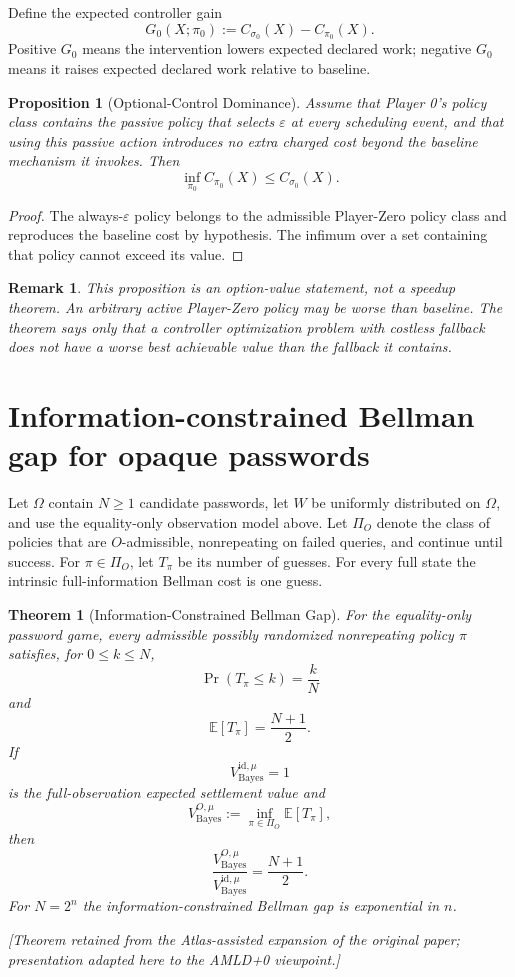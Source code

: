 \documentclass[11pt]{article}
\newtheorem{remark}[definition]{Remark}
\newtheorem{theorem}[definition]{Theorem}
\newtheorem{proposition}[definition]{Proposition}
\newcommand{\atlasnote}{\par\smallskip\noindent\textit{[Theorem retained from the Atlas-assisted expansion of the original paper; presentation adapted here to the AMLD+0 viewpoint.] }\par\smallskip}
\begin{document}
Define the expected controller gain
\[
G_0(X;\pi_0)
:=C_{\sigma_0}(X)-C_{\pi_0}(X).
\]
Positive $G_0$ means the intervention lowers expected declared work; negative
$G_0$ means it raises expected declared work relative to baseline.

\begin{proposition}[Optional-Control Dominance]
Assume that Player 0's policy class contains the passive policy that selects
$\varepsilon$ at every scheduling event, and that using this passive action
introduces no extra charged cost beyond the baseline mechanism it invokes.
Then
\[
\inf_{\pi_0} C_{\pi_0}(X)\le C_{\sigma_0}(X).
\]
\end{proposition}

\begin{proof}
The always-$\varepsilon$ policy belongs to the admissible Player-Zero policy
class and reproduces the baseline cost by hypothesis.  The infimum over a set
containing that policy cannot exceed its value.
\end{proof}

\begin{remark}
This proposition is an option-value statement, not a speedup theorem.  An
arbitrary active Player-Zero policy may be worse than baseline.  The theorem
says only that a controller optimization problem with costless fallback does
not have a worse \emph{best achievable} value than the fallback it contains.
\end{remark}

\section{Information-constrained Bellman gap for opaque passwords}

Let $\Omega$ contain $N\ge 1$ candidate passwords, let $W$ be uniformly
distributed on $\Omega$, and use the equality-only observation model above.
Let $\Pi_O$ denote the class of policies that are $O$-admissible, nonrepeating
on failed queries, and continue until success.  For $\pi\in\Pi_O$, let
$T_\pi$ be its number of guesses.  For every full
state the intrinsic full-information Bellman cost is one guess.

\begin{theorem}[Information-Constrained Bellman Gap]
For the equality-only password game, every admissible possibly randomized
nonrepeating policy $\pi$ satisfies, for $0\le k\le N$,
\[
\Pr(T_\pi\le k)=\frac{k}{N}
\]
and
\[
\mathbb E[T_\pi]=\frac{N+1}{2}.
\]
If
\[
V^{\mathrm{id},\mu}_{\mathrm{Bayes}}=1
\]
is the full-observation expected settlement value and
\[
V^{O,\mu}_{\mathrm{Bayes}}
:=\inf_{\pi\in\Pi_O}\mathbb E[T_\pi],
\]
then
\[
\boxed{
\frac{V^{O,\mu}_{\mathrm{Bayes}}}
     {V^{\mathrm{id},\mu}_{\mathrm{Bayes}}}
=\frac{N+1}{2}.}
\]
For $N=2^n$ the information-constrained Bellman gap is exponential in $n$.
\end{theorem}
\atlasnote
\end{document}

